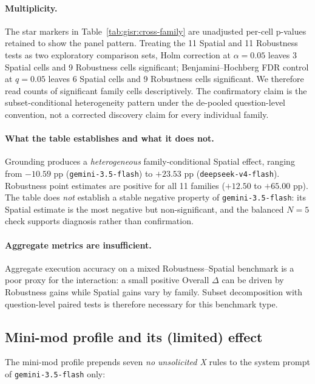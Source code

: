 \paragraph{Multiplicity.} The star markers in Table~\ref{tab:gisr:cross-family} are unadjusted per-cell p-values retained to show the panel pattern. Treating the 11 Spatial and 11 Robustness tests as two exploratory comparison sets, Holm correction at $\alpha{=}0.05$ leaves 3 Spatial cells and 9 Robustness cells significant; Benjamini--Hochberg FDR control at $q{=}0.05$ leaves 6 Spatial cells and 9 Robustness cells significant. We therefore read counts of significant family cells descriptively. The confirmatory claim is the subset-conditional heterogeneity pattern under the de-pooled question-level convention, not a corrected discovery claim for every individual family.

\paragraph{What the table establishes and what it does not.} Grounding produces a \emph{heterogeneous} family-conditional Spatial effect, ranging from $-10.59$ pp (\texttt{gemini-3.5-flash}) to $+23.53$ pp (\texttt{deepseek-v4-flash}). Robustness point estimates are positive for all 11 families ($+12.50$ to $+65.00$ pp). The table does \emph{not} establish a stable negative property of \texttt{gemini-3.5-flash}: its Spatial estimate is the most negative but non-significant, and the balanced $N=5$ check supports diagnosis rather than confirmation.

\paragraph{Aggregate metrics are insufficient.} Aggregate execution accuracy on a mixed Robustness--Spatial benchmark is a poor proxy for the interaction: a small positive Overall $\Delta$ can be driven by Robustness gains while Spatial gains vary by family. Subset decomposition with question-level paired tests is therefore necessary for this benchmark type.

\subsection{Mini-mod profile and its (limited) effect}
\label{sec:gisr:minimod}

The mini-mod profile prepends seven \emph{no unsolicited X} rules to the system prompt of \texttt{gemini-3.5-flash} only:

